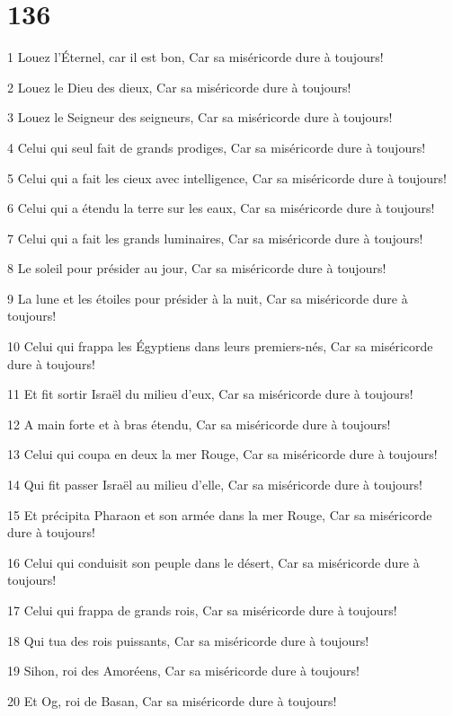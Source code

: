 \chapter{136}

\par 1 Louez l'Éternel, car il est bon, Car sa miséricorde dure à toujours!
\par 2 Louez le Dieu des dieux, Car sa miséricorde dure à toujours!
\par 3 Louez le Seigneur des seigneurs, Car sa miséricorde dure à toujours!
\par 4 Celui qui seul fait de grands prodiges, Car sa miséricorde dure à toujours!
\par 5 Celui qui a fait les cieux avec intelligence, Car sa miséricorde dure à toujours!
\par 6 Celui qui a étendu la terre sur les eaux, Car sa miséricorde dure à toujours!
\par 7 Celui qui a fait les grands luminaires, Car sa miséricorde dure à toujours!
\par 8 Le soleil pour présider au jour, Car sa miséricorde dure à toujours!
\par 9 La lune et les étoiles pour présider à la nuit, Car sa miséricorde dure à toujours!
\par 10 Celui qui frappa les Égyptiens dans leurs premiers-nés, Car sa miséricorde dure à toujours!
\par 11 Et fit sortir Israël du milieu d'eux, Car sa miséricorde dure à toujours!
\par 12 A main forte et à bras étendu, Car sa miséricorde dure à toujours!
\par 13 Celui qui coupa en deux la mer Rouge, Car sa miséricorde dure à toujours!
\par 14 Qui fit passer Israël au milieu d'elle, Car sa miséricorde dure à toujours!
\par 15 Et précipita Pharaon et son armée dans la mer Rouge, Car sa miséricorde dure à toujours!
\par 16 Celui qui conduisit son peuple dans le désert, Car sa miséricorde dure à toujours!
\par 17 Celui qui frappa de grands rois, Car sa miséricorde dure à toujours!
\par 18 Qui tua des rois puissants, Car sa miséricorde dure à toujours!
\par 19 Sihon, roi des Amoréens, Car sa miséricorde dure à toujours!
\par 20 Et Og, roi de Basan, Car sa miséricorde dure à toujours!
